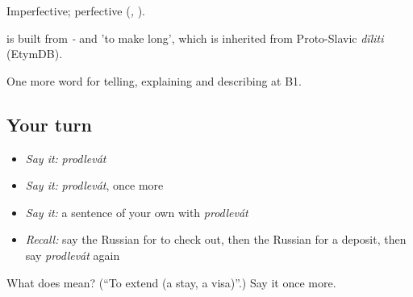 Imperfective; perfective \emph{} (\emph{, }).

\begin{cousinweb}
\emph{} is built from \emph{-} and \emph{} 'to make long', which is inherited from Proto-Slavic \emph{dĭliti} (EtymDB).
\end{cousinweb}

\begin{grammarlens}[title={What you've built}]
One more word for telling, explaining and describing at B1.
\end{grammarlens}

\subsection*{Your turn}
\begin{itemize}
\raggedright
  \item \emph{Say it:} \emph{prodlevát}
  \item \emph{Say it:} \emph{prodlevát}, once more
  \item \emph{Say it:} a sentence of your own with \emph{prodlevát}
  \item \emph{Recall:} say the Russian for to check out, then the Russian for a deposit, then say \emph{prodlevát} again
\end{itemize}

\begin{tcolorbox}[breakable,colback=teal!4,colframe=teal!35!black,title={Before you move on}]
What does  mean? (\textquotedblleft{}To extend (a stay, a visa)\textquotedblright{}.) Say it once more.
\end{tcolorbox}

